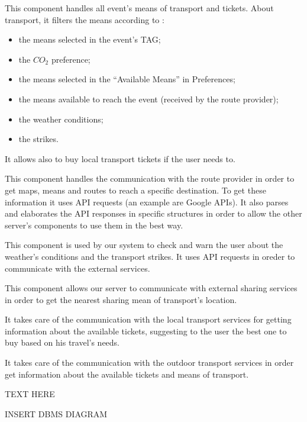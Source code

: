 This component handles all event’s means of transport and tickets. About transport, it filters the means according to :
\begin{itemize}
	\setlength{\leftskip}{1cm}
	\item the means selected in the event’s TAG;
	\item the $CO_2$ preference;
	\item the means selected in the “Available Means” in Preferences;
	\item the means available to reach the event (received by the route provider);
	\item the weather conditions;
	\item the strikes.
\end{itemize}
It allows also to buy local transport tickets if the user needs to. 

This component handles the communication with the route provider in order to get maps, means and routes to reach a specific destination. To get these information it uses API requests (an example are Google APIs).
It also parses and elaborates the API responses in specific structures in order to allow the other server’s components to use them in the best way.

This component is used by our system to check and warn the user about the weather's conditions and the transport strikes.
It uses API requests in oreder to communicate with the external services.

This component allows our server to communicate with external sharing services in order to get the nearest sharing mean of transport's location.

It takes care of the communication with the local transport services for getting information about the available tickets, suggesting to the user the best one to buy based on his travel's needs.

It takes care of the communication with the outdoor transport services in order get information about the available tickets and means of transport.


TEXT HERE


INSERT DBMS DIAGRAM

